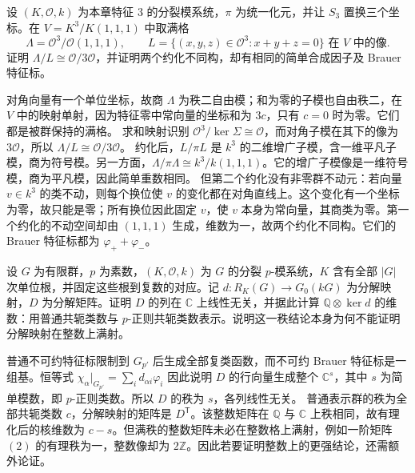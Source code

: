 \begin{optionalexercise}\label{b5:ex:08-s3-two-lattices}
	设 \((K,\mathcal O,k)\) 为本章特征 \(3\) 的分裂模系统，\(\pi\) 为统一化元，并让 \(S_3\) 置换三个坐标。在 \(V=K^3/K(1,1,1)\) 中取满格
	\[
		\Lambda=\mathcal O^3/\mathcal O(1,1,1),\qquad L=\text{\(\bigl\{(x,y,z)\in\mathcal O^3:x+y+z=0\bigr\}\) 在 \(V\) 中的像}.
	\]
	证明 \(\Lambda/L\cong\mathcal O/3\mathcal O\)，并证明两个约化不同构，却有相同的简单合成因子及 Brauer 特征标。
\end{optionalexercise}
\begin{solution}
	对角向量有一个单位坐标，故商 \(\Lambda\) 为秩二自由模；和为零的子模也自由秩二，在 \(V\) 中的映射单射，因为特征零中常向量的坐标和为 \(3c\)，只有 \(c=0\) 时为零。它们都是被群保持的满格。 求和映射识别 \(\mathcal O^3/\ker\Sigma\cong\mathcal O\)，而对角子模在其下的像为 \(3\mathcal O\)，所以 \(\Lambda/L\cong\mathcal O/3\mathcal O\)。 约化后，\(L/\pi L\) 是 \(k^3\) 的二维增广子模，含一维平凡子模，商为符号模。另一方面，\(\Lambda/\pi\Lambda\cong k^3/k(1,1,1)\)。它的增广子模像是一维符号模，商为平凡模，因此简单重数相同。 但第二个约化没有非零群不动元：若向量 \(v\in k^3\) 的类不动，则每个换位使 \(v\) 的变化都在对角直线上。这个变化有一个坐标为零，故只能是零；所有换位因此固定 \(v\)，使 \(v\) 本身为常向量，其商类为零。第一个约化的不动空间却由 \((1,1,1)\) 生成，维数为一，故两个约化不同构。它们的 Brauer 特征标都为 \(\varphi_++\varphi_-\)。
\end{solution}

\begin{optionalexercise}\label{b5:ex:08-decomposition-column-rank}
	设 \(G\) 为有限群，\(p\) 为素数，\((K,\mathcal O,k)\) 为 \(G\) 的分裂 \(p\)-模系统，\(K\) 含有全部 \(|G|\) 次单位根，并固定这些根到复数的对应。记 \(d:R_K(G)\to G_0(kG)\) 为分解映射，\(D\) 为分解矩阵。证明 \(D\) 的列在 \(\mathbb C\) 上线性无关，并据此计算 \(\mathbb Q\otimes\ker d\) 的维数：用普通共轭类数与 \(p\)-正则共轭类数表示。说明这一秩结论本身为何不能证明分解映射在整数上满射。
\end{optionalexercise}
\begin{solution}
	普通不可约特征标限制到 \(G_{p'}\) 后生成全部复类函数，而不可约 Brauer 特征标是一组基。恒等式 \(\chi_\alpha|_{G_{p'}}=\sum_i d_{\alpha i}\varphi_i\) 因此说明 \(D\) 的行向量生成整个 \(\mathbb C^s\)，其中 \(s\) 为简单模数，即 \(p\)-正则类数。所以 \(D\) 的秩为 \(s\)，各列线性无关。 普通表示群的秩为全部共轭类数 \(c\)，分解映射的矩阵是 \(D^{\mathsf T}\)。该整数矩阵在 \(\mathbb Q\) 与 \(\mathbb C\) 上秩相同，故有理化后的核维数为 \(c-s\)。但满秩的整数矩阵未必在整数格上满射，例如一阶矩阵 \((2)\) 的有理秩为一，整数像却为 \(2\mathbb Z\)。因此若要证明整数上的更强结论，还需额外论证。
\end{solution}

